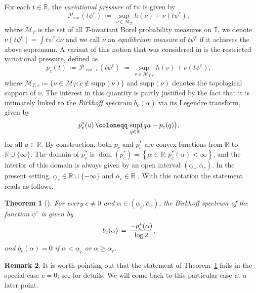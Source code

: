 \documentclass[11pt,reqno]{amsart}
\theoremstyle{plain}
\newtheorem{theorem}{Theorem}[section]
\theoremstyle{definition}
\newtheorem{remark}[theorem]{Remark}
\newcommand{\birk}{b}
\newcommand{\R}{{\mathbb R}}
\newcommand{\ts}{\hspace{0.5pt}}
\newcommand{\supp}{\mathrm{supp}}
\newcommand{\TT}{\mathbb{T}}
\begin{document}
For each $t \in \R$, the \emph{variational pressure} of $t \psi$ is given by
\[
\mathcal{P}_{\operatorname{var}}\left(t \psi^{c} \right)
\,\coloneqq \,\sup_{\nu\in\mathcal{M}_{T}} h\left( \nu\right)+ \nu\left(t\psi^c\right),
\]
where $\mathcal{M}_T$ is the set of all $T$-invariant Borel probability measures on $\TT$, we denote $\nu\left(t\psi^c\right)=\int t\psi^c\,\mathrm{d}\nu$ and we call $\nu$ an \emph{equilibrium measure} of $t \psi^{c}$ if it achieves the above supremum.
A variant of this notion that was considered in \cite{fan_generalized_2020} is the restricted variational pressure, defined as
\[
 p_c(t)\,\coloneqq\,\mathcal{P}_{\operatorname{var},c}\left(t\psi^c\right)\,\coloneqq\,\sup_{\nu\in\mathcal{M}_{T,c}} h\left(\nu\right)+ \nu\left(t\psi^c\right),
\]
where $\mathcal{M}_{T,c}\coloneqq\{\nu\in\mathcal{M}_T\colon \breve{c} \notin \supp\left(\nu\right)\}$ and $\supp( \nu)$  denotes the topological support of $\nu$. 
The interest in this quantity is partly justified by the fact that it is intimately linked to the \emph{Birkhoff spectrum} $\birk_{c}(\alpha)$ via its Legendre transform, given by
\begin{equation*}%
  p_c^{*} (a) \, \coloneqq \, \sup_{q\in\R}
  \bigl( q \ts a - p_{c} (q) \bigr),
\end{equation*}
for all $a \in \R$. By construction, both $p_c$ and $p_c^{\ast}$ are convex functions from $\R$ to $\R \cup \{\infty\}$. The domain of $p_c^{\ast}$ is $\operatorname{dom}(p_c^{\ast}) = \left\{\alpha \in \R : p_c^{\ast}(\alpha) < \infty \right\}$, and the interior of this domain is always given by an open interval $(\underline{\alpha}_c,\overline{\alpha}_c)$. In the present setting, $\underline{\alpha}_c \in \R \cup \{ - \infty\}$ and $\overline{\alpha}_c \in \R$ \cite{fan_generalized_2020}. With this notation the statement reads as follows.

\begin{theorem}[{\cite[Thm.~B]{fan_generalized_2020}}]\label{cor: dim}
   For every $c \neq 0$ and $\alpha \in (\underline{\alpha}_c,\overline{\alpha}_c)$, the Birkhoff spectrum of the function\/ $\psi^c$ is given by
   \begin{equation*}%
  \birk_c (\alpha ) \, = \, \frac{-p_c^{*}\ts (\alpha)}{\log 2},
\end{equation*}
and $b_c(\alpha) = 0$ if $\alpha < \underline{\alpha}_c$ or $\alpha \geqslant \overline{\alpha}_c$.
\end{theorem}

\begin{remark}
It is worth pointing out that the statement of Theorem~\ref{cor: dim} fails in the special case $c=0$; see \cite[Thm.~5.1]{fan_generalized_2020} for details. We will come back to this particular case at a later point.
\end{remark}
\end{document}
